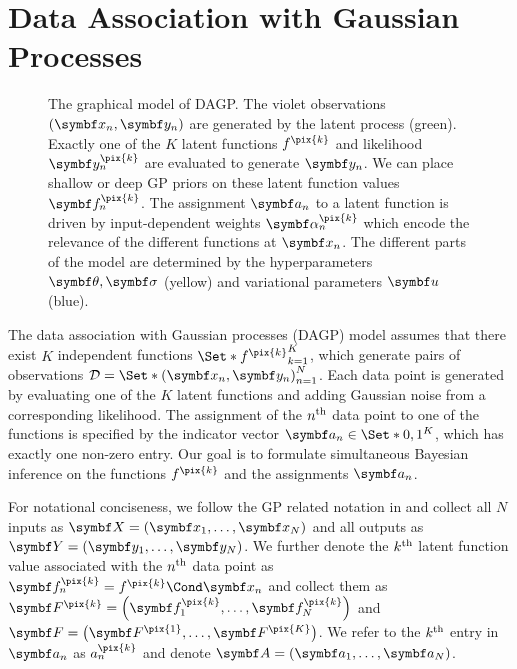 \section{Data Association with Gaussian Processes}
\label{toc:data_association:model}
\begin{figure}[t]
    \centering
    
    \caption{
    \label{fig:data_association:data_association_graphical_model}
    The graphical model of DAGP.
    The violet observations $(\mat{x_n}, \mat{y_n})$ are generated by the latent process (green).
    Exactly one of the $K$ latent functions $f^{\pix{k}}$ and likelihood $\mat{y_n^{\pix{k}}}$ are evaluated to generate $\mat{y_n}$.
    We can place shallow or deep GP priors on these latent function values $\mat{f_n^{\pix{k}}}$.
    The assignment $\mat{a_n}$ to a latent function is driven by input-dependent weights $\mat{\alpha_n^{\pix{k}}}$ which encode the relevance of the different functions at $\mat{x_n}$.
    The different parts of the model are determined by the hyperparameters $\mat{\theta}, \mat{\sigma}$ (yellow) and variational parameters $\mat{u}$ (blue).
    }
\end{figure}
The data association with Gaussian processes (DAGP) model assumes that there exist $K$ independent functions $\Set*{f^{\pix{k}}}_{k=1}^K$, which generate pairs of observations $\Dc = \Set*{(\mat{x_n}, \mat{y_n})}_{n=1}^N$.
Each data point is generated by evaluating one of the $K$ latent functions and adding Gaussian noise from a corresponding likelihood.
The assignment of the $n^{\text{th}}$ data point to one of the functions is specified by the indicator vector $\mat{a_n} \in \Set*{0, 1}^K$, which has exactly one non-zero entry.
Our goal is to formulate simultaneous Bayesian inference on the functions $f^{\pix{k}}$ and the assignments $\mat{a_n}$.

For notational conciseness, we follow the GP related notation in \parencite{hensman_scalable_2015} and collect all $N$ inputs as $\mat{X} = \left(\mat{x_1}, \ldots, \mat{x_N}\right)$ and all outputs as $\mat{Y} = \left(\mat{y_1}, \ldots, \mat{y_N}\right)$.
We further denote the $k^{\text{th}}$ latent function value associated with the $n^{\text{th}}$ data point as $\rv{f_n^{\pix{k}}} = \Fun{f^{\pix{k}}}{\mat{x_n}}$ and collect them as $\mat{F^{\pix{k}}} = \left( \rv{f_1^{\pix{k}}}, \ldots, \rv{f_N^{\pix{k}}} \right)$ and $\mat{F} = \left( \mat{F^{\pix{1}}}, \ldots, \mat{F^{\pix{K}}} \right)$.
We refer to the $k^{\text{th}}$ entry in $\mat{a_n}$ as $a_n^{\pix{k}}$ and denote $\mat{A} = \left(\mat{a_1}, \ldots, \mat{a_N}\right)$.

